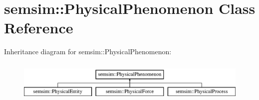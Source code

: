 \hypertarget{classsemsim_1_1PhysicalPhenomenon}{}\section{semsim\+:\+:Physical\+Phenomenon Class Reference}
\label{classsemsim_1_1PhysicalPhenomenon}
Inheritance diagram for semsim\+:\+:Physical\+Phenomenon\+:\begin{figure}[H]
\begin{center}
\leavevmode
\includegraphics[height=1.996435cm]{classsemsim_1_1PhysicalPhenomenon}
\end{center}
\end{figure}
